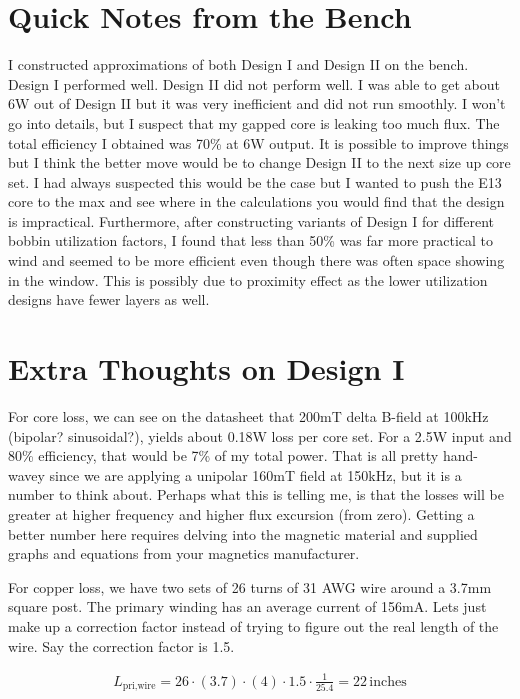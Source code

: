 \documentclass{article}
\begin{document}
\section{Quick Notes from the Bench}
I constructed approximations of both Design I and Design II on the bench.  Design I performed well.  Design II did not perform well.  I was able to get about 6W out of Design II but it was very inefficient and did not run smoothly.  I won’t go into details, but I suspect that my gapped core is leaking too much flux.  The total efficiency I obtained was 70\% at 6W output.  It is possible to improve things but I think the better move would be to change Design II to the next size up core set.  I had always suspected this would be the case but I wanted to push the E13 core to the max and see where in the calculations you would find that the design is impractical.
Furthermore, after constructing variants of Design I for different bobbin utilization factors, I found that less than 50\% was far more practical to wind and seemed to be more efficient even though there was often space showing in the window.  This is possibly due to proximity effect as the lower utilization designs have fewer layers as well.

\section{Extra Thoughts on Design I}
For core loss, we can see on the datasheet that 200mT delta B-field at 100kHz (bipolar? sinusoidal?), yields about 0.18W loss per core set.  For a 2.5W input and 80\% efficiency, that would be 7\% of my total power.  That is all pretty hand-wavey since we are applying a unipolar 160mT field at 150kHz, but it is a number to think about.  Perhaps what this is telling me, is that the losses will be greater at higher frequency and higher flux excursion (from zero).  Getting a better number here requires delving into the magnetic material and supplied graphs and equations from your magnetics manufacturer.

For copper loss, we have two sets of 26 turns of 31 AWG wire around a 3.7mm square post.  The primary winding has an average current of 156mA.  Lets just make up a correction factor instead of trying to figure out the real length of the wire.  Say the correction factor is 1.5.

\begin{align*}
L_{\text{pri,wire}} = 26 \cdot (3.7) \cdot (4) \cdot 1.5 \cdot \frac{1}{25.4} = 22 \, \text{inches}
\end{align*}
\end{document}
